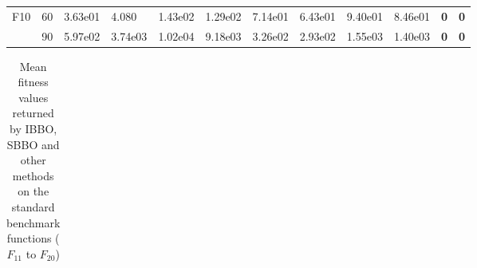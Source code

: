 \begin{table}
\begin{center}
\begin{tabular}{p{0.3in} | p{0.4in} | p{0.6in} |  p{0.6in} |  p{0.6in}|  p{0.6in} |  p{0.6in} | p{0.6in} |  p{0.6in} | p{0.6in} |  p{0.6in} |  p{0.6in}}
F10    &    60    &    3.63e01    &{    4.080    }&    1.43e02    &    1.29e02    &    7.14e01    &    6.43e01    &    9.40e01    &    8.46e01    &    \textbf{    0    }&    \textbf{    0}\\
    &    90    &    5.97e02    &    3.74e03    &    1.02e04    &    9.18e03    &    3.26e02    &    2.93e02    &    1.55e03    &    1.40e03    &    \textbf{    0}&    \textbf{    0    }\\
\hline            

\end{tabular}
\end{center}
\label{tab:mean1}
\end{table}


\begin{table}
\scriptsize
\caption[Mean fitness values returned by IBBO, SBBO and other methods on the standard benchmark functions ($F_{11}$ to $F_{20}$) ]{\fontsize{10}{12} \selectfont Mean fitness values returned by IBBO, SBBO and other methods on the standard benchmark functions ($F_{11}$ to $F_{20}$) }
\begin{center}
\renewcommand{\arraystretch}{1.3}
\begin{tabular}{p{0.3in} | p{0.4in} | p{0.6in} |  p{0.6in} |  p{0.6in}|  p{0.6in} |  p{0.6in} | p{0.6in} |  p{0.6in} | p{0.6in} |  p{0.6in} |  p{0.6in}}
  

\end{tabular}
\end{center}
\end{table}

